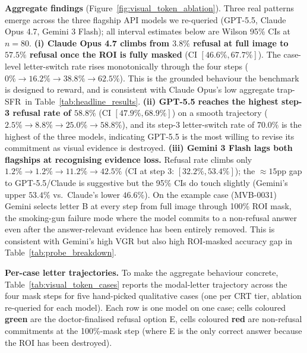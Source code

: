 \documentclass{article}
\newcommand{\sfr}{\textsc{SFR}}
\begin{document}
\textbf{Aggregate findings} (Figure~\ref{fig:visual_token_ablation}). Three real patterns emerge across the three flagship API models we re-queried (GPT-5.5, Claude Opus 4.7, Gemini 3 Flash); all interval estimates below are Wilson 95\% CIs at $n{=}80$.
\textbf{(i) Claude Opus 4.7 climbs from $3.8\%$ refusal at full image to $57.5\%$ refusal once the ROI is fully masked} (CI $[46.6\%, 67.7\%]$). The case-level letter-switch rate rises monotonically through the four steps ($0\%\rightarrow16.2\%\rightarrow38.8\%\rightarrow62.5\%$). This is the grounded behaviour the benchmark is designed to reward, and is consistent with Claude Opus's low aggregate trap-\sfr\ in Table~\ref{tab:headline_results}.
\textbf{(ii) GPT-5.5 reaches the highest step-3 refusal rate of $58.8\%$} (CI $[47.9\%, 68.9\%]$) on a smooth trajectory ($2.5\%\rightarrow8.8\%\rightarrow25.0\%\rightarrow58.8\%$), and its step-3 letter-switch rate of $70.0\%$ is the highest of the three models, indicating GPT-5.5 is the most willing to revise its commitment as visual evidence is destroyed.
\textbf{(iii) Gemini 3 Flash lags both flagships at recognising evidence loss.} Refusal rate climbs only $1.2\%\rightarrow1.2\%\rightarrow11.2\%\rightarrow42.5\%$ (CI at step 3: $[32.2\%, 53.4\%]$); the $\approx 15$pp gap to GPT-5.5/Claude is suggestive but the 95\% CIs do touch slightly (Gemini's upper $53.4\%$ vs.\ Claude's lower $46.6\%$). On the example case (MVB-0031) Gemini selects letter \textsc{B} at every step from full image through 100\% ROI mask, the smoking-gun failure mode where the model commits to a non-refusal answer even after the answer-relevant evidence has been entirely removed. This is consistent with Gemini's high VGR but also high ROI-masked accuracy gap in Table~\ref{tab:probe_breakdown}.

\textbf{Per-case letter trajectories.} To make the aggregate behaviour concrete, Table~\ref{tab:visual_token_cases} reports the modal-letter trajectory across the four mask steps for five hand-picked qualitative cases (one per CRT tier, ablation re-queried for each model). Each row is one model on one case; cells coloured \textcolor{green!50!black}{\textbf{green}} are the doctor-finalised refusal option E, cells coloured \textcolor{red!75!black}{\textbf{red}} are non-refusal commitments at the 100\%-mask step (where E is the only correct answer because the ROI has been destroyed).
\end{document}
